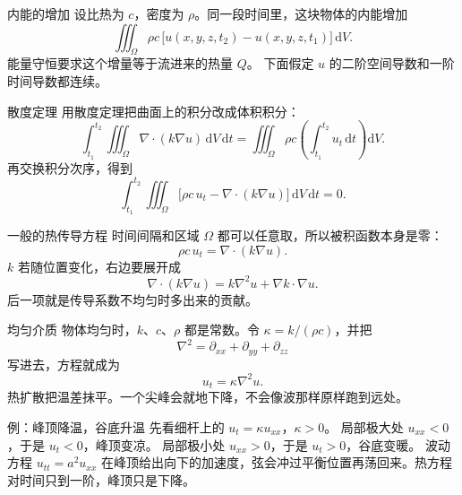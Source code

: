 \documentclass[fontset=windows, chinese, 10pt, xcolor=dvipsnames]{beamer}
\begin{document}
\begin{frame}{内能的增加}
  设比热为 $c$，密度为 $\rho$。同一段时间里，这块物体的内能增加
  \begin{equation*}
    \iiint_{\Omega}\rho c\,
      \bigl[u(x,y,z,t_2)-u(x,y,z,t_1)\bigr]\,\mathrm{d}V.
  \end{equation*}
  能量守恒要求这个增量等于流进来的热量 $Q$。
  下面假定 $u$ 的二阶空间导数和一阶时间导数都连续。
\end{frame}

\begin{frame}{散度定理}
  用散度定理把曲面上的积分改成体积积分：
  \begin{equation*}
    \int_{t_1}^{t_2}\iiint_{\Omega}\nabla\cdot(k\nabla u)\,\mathrm{d}V\,\mathrm{d}t
    =\iiint_{\Omega}\rho c\left(\int_{t_1}^{t_2}u_t\,\mathrm{d}t\right)\mathrm{d}V.
  \end{equation*}
  再交换积分次序，得到
  \begin{equation*}
    \int_{t_1}^{t_2}\iiint_{\Omega}
      \bigl[\rho c\,u_t-\nabla\cdot(k\nabla u)\bigr]\,\mathrm{d}V\,\mathrm{d}t=0.
  \end{equation*}
\end{frame}

\begin{frame}{一般的热传导方程}
  时间间隔和区域 $\Omega$ 都可以任意取，所以被积函数本身是零：
  \begin{equation*}
    \boxed{\rho c\,u_t=\nabla\cdot(k\nabla u).}
  \end{equation*}
  $k$ 若随位置变化，右边要展开成
  \[
  \nabla\cdot(k\nabla u)=k\nabla^2u+\nabla k\cdot\nabla u.
  \]
  后一项就是传导系数不均匀时多出来的贡献。
\end{frame}

\begin{frame}{均匀介质}
  物体均匀时，$k$、$c$、$\rho$ 都是常数。令 $\kappa=k/(\rho c)$，并把
  \begin{equation*}
    \nabla^2=\partial_{xx}+\partial_{yy}+\partial_{zz}
  \end{equation*}
  写进去，方程就成为
  \begin{equation*}
    \boxed{u_t=\kappa\nabla^2u.}
  \end{equation*}
  热扩散把温差抹平。一个尖峰会就地下降，不会像波那样原样跑到远处。
\end{frame}

\begin{frame}{例：峰顶降温，谷底升温}
  先看细杆上的 $u_t=\kappa u_{xx}$，$\kappa>0$。
  局部极大处 $u_{xx}<0$，于是 $u_t<0$，峰顶变凉。
  局部极小处 $u_{xx}>0$，于是 $u_t>0$，谷底变暖。
  \vspace{0.35em}
  波动方程 $u_{tt}=a^2 u_{xx}$ 在峰顶给出向下的加速度，弦会冲过平衡位置再荡回来。热方程对时间只到一阶，峰顶只是下降。
\end{frame}
\end{document}

